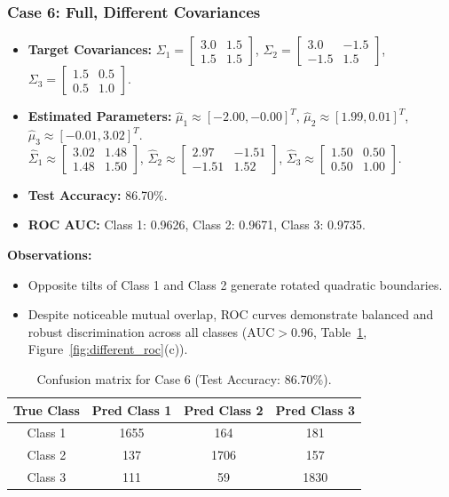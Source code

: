 \documentclass[11pt,a4paper]{article}
\begin{document}
\subsubsection{Case 6: Full, Different Covariances}
\begin{itemize}
  \item \textbf{Target Covariances:} $\Sigma_1=\begin{bmatrix}3.0&1.5\\1.5&1.5\end{bmatrix}$, $\Sigma_2=\begin{bmatrix}3.0&-1.5\\-1.5&1.5\end{bmatrix}$, $\Sigma_3=\begin{bmatrix}1.5&0.5\\0.5&1.0\end{bmatrix}$.
  \item \textbf{Estimated Parameters:} $\hat{\mu}_1\approx[-2.00,-0.00]^T$, $\hat{\mu}_2\approx[1.99,0.01]^T$, $\hat{\mu}_3\approx[-0.01,3.02]^T$.\\
  $\hat{\Sigma}_1\approx\begin{bmatrix}3.02&1.48\\1.48&1.50\end{bmatrix}$,
  $\hat{\Sigma}_2\approx\begin{bmatrix}2.97&-1.51\\-1.51&1.52\end{bmatrix}$,
  $\hat{\Sigma}_3\approx\begin{bmatrix}1.50&0.50\\0.50&1.00\end{bmatrix}$.
  \item \textbf{Test Accuracy:} 86.70\%.
  \item \textbf{ROC AUC:} Class 1: 0.9626, Class 2: 0.9671, Class 3: 0.9735.
\end{itemize}
\textbf{Observations:}
\begin{itemize}
  \item Opposite tilts of Class 1 and Class 2 generate rotated quadratic boundaries.
  \item Despite noticeable mutual overlap, ROC curves demonstrate balanced and robust discrimination across all classes ($\text{AUC} > 0.96$, Table~\ref{tab:c6}, Figure~\ref{fig:different_roc}(c)).
\end{itemize}

\begin{table}[ht]
\centering
\begin{tabular}{cccc}
\toprule
\textbf{True Class} & \textbf{Pred Class 1} & \textbf{Pred Class 2} & \textbf{Pred Class 3}\\
\midrule
Class 1 & 1655 & 164 & 181\\
Class 2 & 137 & 1706 & 157\\
Class 3 & 111 & 59 & 1830\\
\bottomrule
\end{tabular}
\caption{Confusion matrix for Case 6 (Test Accuracy: 86.70\%).}
\label{tab:c6}
\end{table}
\end{document}
